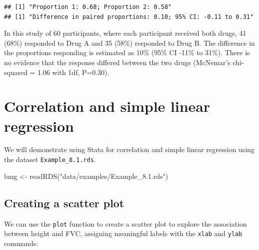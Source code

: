\documentclass[
]{memoir}
\newenvironment{Shaded}{\begin{snugshade}}{\end{snugshade}}
\newcommand{\AttributeTok}[1]{\textcolor[rgb]{0.77,0.63,0.00}{#1}}
\newcommand{\FunctionTok}[1]{\textcolor[rgb]{0.00,0.00,0.00}{#1}}
\newcommand{\NormalTok}[1]{#1}
\newcommand{\OtherTok}[1]{\textcolor[rgb]{0.56,0.35,0.01}{#1}}
\newcommand{\SpecialCharTok}[1]{\textcolor[rgb]{0.00,0.00,0.00}{#1}}
\newcommand{\StringTok}[1]{\textcolor[rgb]{0.31,0.60,0.02}{#1}}
\begin{document}
\begin{verbatim}
## [1] "Proportion 1: 0.68; Proportion 2: 0.58"
## [1] "Difference in paired proportions: 0.10; 95% CI: -0.11 to 0.31"
\end{verbatim}

In this study of 60 participants, where each participant received both drugs, 41 (68\%) responded to Drug A and 35 (58\%) responded to Drug B. The difference in the proportions responding is estimated as 10\% (95\% CI -11\% to 31\%). There is no evidence that the response differed between the two drugs (McNemar's chi-squared = 1.06 with 1df, P=0.30).

\hypertarget{correlation-and-simple-linear-regression}{%
\chapter{Correlation and simple linear regression}\label{correlation-and-simple-linear-regression}}

We will demonstrate using Stata for correlation and simple linear regression using the dataset \texttt{Example\_8.1.rds}.

\begin{Shaded}
\begin{Highlighting}[]
\NormalTok{lung }\OtherTok{\textless{}{-}} \FunctionTok{readRDS}\NormalTok{(}\StringTok{"data/examples/Example\_8.1.rds"}\NormalTok{)}
\end{Highlighting}
\end{Shaded}

\hypertarget{creating-a-scatter-plot}{%
\section{Creating a scatter plot}\label{creating-a-scatter-plot}}

We can use the \texttt{plot} function to create a scatter plot to explore the association between height and FVC, assigning meaningful labels with the \texttt{xlab} and \texttt{ylab} commands:

\begin{Shaded}
\end{Shaded}
\end{document}
